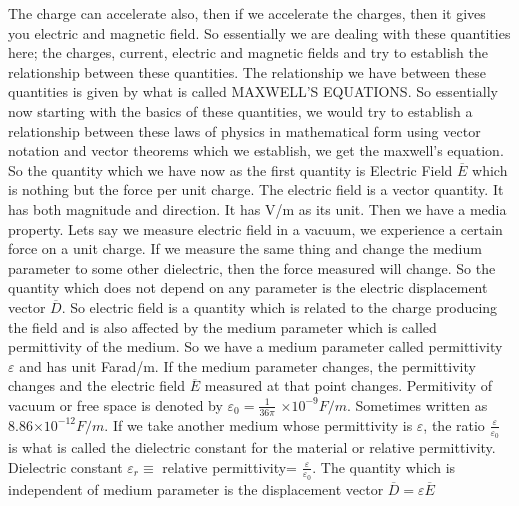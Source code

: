The charge can accelerate also, then if we accelerate the charges, then it gives you electric and magnetic field. So essentially we are dealing with these quantities here; the charges, current, electric and magnetic fields and try to establish the relationship between these quantities. The relationship we have between these quantities is given by what is called MAXWELL'S EQUATIONS. So essentially now starting with the basics of these quantities, we would try to establish a relationship between these laws of physics in mathematical form using vector notation and vector theorems which we establish, we get the maxwell's equation. So the quantity which we have now as the first quantity is Electric Field $\overline{E}$ which is nothing but the force per unit charge. The electric field is a vector quantity. It has both magnitude and direction. It has V/m as its unit. Then we have a media property. Lets say we measure electric field in a vacuum, we experience a certain force on a unit charge. If we measure the same thing and change the medium parameter to some other dielectric, then the force measured will change. So the quantity which does not depend on any parameter is the electric displacement vector $\overline{D}$.
So electric field is a quantity which is related to the charge producing the field and is also affected by the medium parameter which is called permittivity of the medium. So we have a medium parameter called permittivity $\varepsilon$ and has unit Farad/m. If the medium parameter changes, the permittivity changes and the electric field $\overline{E}$ measured at that point changes. Permitivity of vacuum or free space is denoted by $\varepsilon_{0} =\frac{1}{36\pi}$ $\times 10^{-9}F/m$. Sometimes written as 8.86$\times10^{-12}F/m.$
If we take another medium whose permittivity is $\varepsilon$, the ratio $\frac{\varepsilon}{\varepsilon_{0}}$ is what is called the dielectric constant for the material or relative permittivity. 
Dielectric constant $\varepsilon_{r}\equiv$ relative permittivity= $\frac{\varepsilon}{\varepsilon_{0}}$.
The quantity which is independent of medium parameter is the displacement vector $\overline{D}=\varepsilon \overline{E}$

